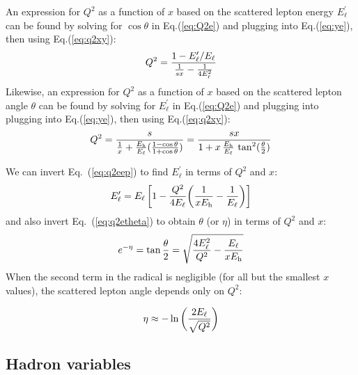 \documentclass[12pt]{article}
\begin{document}
An expression for $Q^2$ as a function of $x$ based on the scattered
lepton energy $E^\prime_\ell$ can be found by solving for $\cos\theta$
in Eq.(\ref{eq:Q2e}) and plugging into Eq.(\ref{eq:ye}), then using
Eq.(\ref{eq:q2xy}):
%
\begin{equation}
Q^2 = {1- E^\prime_\ell/E_\ell \over {1\over s x} - {1 \over 4E_\ell^2} } 
\label{eq:q2eep}
\end{equation}
%
Likewise, an expression for $Q^2$ as a function of $x$ based on the
scattered lepton angle $\theta$ can be found by solving for $E^\prime_\ell$ in
Eq.(\ref{eq:Q2e}) and plugging into plugging into Eq.(\ref{eq:ye}), then using
Eq.(\ref{eq:q2xy}):
%
\begin{equation}
Q^2 = {s \over {1\over x} + {E_{\rm h} \over E_\ell}({1-\cos\theta
    \over 1+\cos\theta}) } =
{sx \over {1} + x\,{E_{\rm h} \over E_\ell}\,\tan^2({\theta \over 2})} 
\label{eq:q2etheta}
\end{equation}

We can invert Eq.~(\ref{eq:q2eep}) to find $E^\prime_\ell$ in terms of $Q^2$ and $x$:
%
\begin{equation}
E^\prime_\ell  = E_\ell\, \bigg[ 1 - {Q^2 \over 4 E_\ell}\bigg({1 \over x E_{\rm h}} - {1\over E_\ell} \bigg)\bigg]
\label{eq:ep}
\end{equation}
%
and also invert Eq.~(\ref{eq:q2etheta}) to obtain $\theta$ (or $\eta$) in terms of $Q^2$ and $x$:
%
\begin{equation}
e^{-\eta} = \tan {\theta \over 2}   = \sqrt{ {4 E_\ell^2 \over Q^2} - {E_\ell \over x E_{\rm h}}}
\label{eq:theta}
\end{equation}
%
When the second term in the radical is negligible (for all but the smallest $x$ values), the scattered lepton angle depends only on $Q^2$:

\begin{equation}
\eta \approx -\ln \bigg( {2 E_\ell \over \sqrt{Q^2}} \bigg)
\end{equation}
%


\subsection{Hadron variables}
\end{document}
